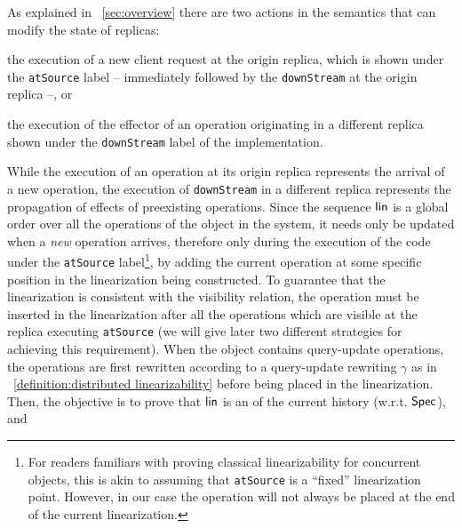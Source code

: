 As explained in \sectionautorefname~\ref{sec:overview} there are two actions in the
semantics that can modify the state of replicas:
\begin{inparaenum}
\item the execution of a new client request at the origin replica,
  which is shown under the \lstinline|atSource| label -- immediately
  followed by the \lstinline|downStream| at the origin replica
  --, or
\item the execution of the effector of an operation originating in a
  different replica shown under the \lstinline|downStream| label of
  the implementation.
\end{inparaenum}
%
While the execution of an operation at its origin replica represents
the arrival of a new operation, the execution of 
\lstinline|downStream| in a different replica represents the
propagation of effects of preexisting operations.
%
Since the sequence $\mathsf{lin}$ is a global order over all the
operations of the object in the system, it needs only be updated when
a \emph{new} operation arrives, therefore only during the execution of the code under the
\lstinline|atSource| label\footnote{For readers familiars with proving classical
  linearizability for concurrent objects, this is akin to assuming that
  \lstinline|atSource| is a ``fixed'' linearization point.
  However, in our case the operation will not
  always be placed at the end of the current linearization.},
by adding the current operation at some specific position in the
linearization being constructed.
%
%
To guarantee that the linearization is consistent with the visibility
relation, the operation must be inserted in the linearization after
all the operations which are visible at the replica executing
\lstinline|atSource| (we will give later two different strategies for achieving this requirement).
When the object contains query-update operations, the operations are
first rewritten according to a query-update rewriting $\gamma$ as in
~\ref{definition:distributed linearizability} before being placed
in the linearization.
Then, the objective is to prove that $\mathsf{lin}$ is an
\crdtlinearization{} of the current history (w.r.t. $\mathsf{Spec}{}$), and
